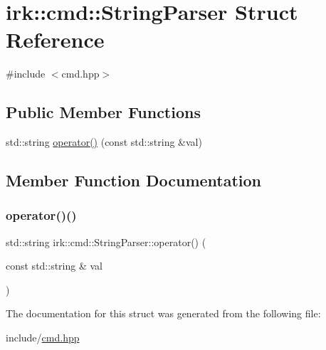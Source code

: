 \hypertarget{structirk_1_1cmd_1_1StringParser}{}\section{irk\+:\+:cmd\+:\+:String\+Parser Struct Reference}
\label{structirk_1_1cmd_1_1StringParser}


{\ttfamily \#include $<$cmd.\+hpp$>$}

\subsection*{Public Member Functions}
\begin{DoxyCompactItemize}
\item 
std\+::string \mbox{\hyperlink{structirk_1_1cmd_1_1StringParser_a3462a76bae53c48518150143018160f3}{operator()}} (const std\+::string \&val)
\end{DoxyCompactItemize}


\subsection{Member Function Documentation}
\mbox{\label{structirk_1_1cmd_1_1StringParser_a3462a76bae53c48518150143018160f3}} 
\subsubsection{\texorpdfstring{operator()()}{operator()()}}
{\footnotesize\ttfamily std\+::string irk\+::cmd\+::\+String\+Parser\+::operator() (\begin{DoxyParamCaption}\item[{const std\+::string \&}]{val }\end{DoxyParamCaption})\hspace{0.3cm}{\ttfamily [inline]}}



The documentation for this struct was generated from the following file\+:\begin{DoxyCompactItemize}
\item 
include/\mbox{\hyperlink{cmd_8hpp}{cmd.\+hpp}}\end{DoxyCompactItemize}
